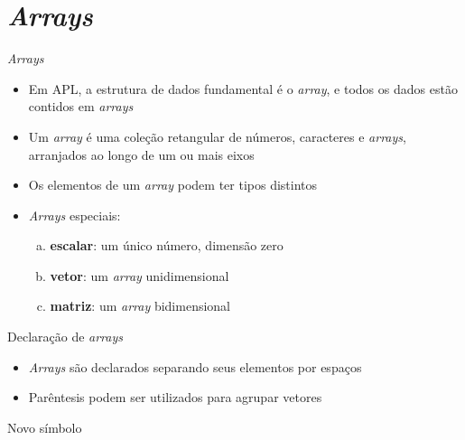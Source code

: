 \section{\it Arrays}

\begin{frame}[fragile]{\it Arrays}

    \begin{itemize}
        \item Em APL, a estrutura de dados fundamental é o \textit{array}, e todos os dados estão contidos em \textit{arrays}
        \pause

        \item Um \textit{array} é uma coleção retangular de números, caracteres e \textit{arrays}, arranjados ao longo de um ou mais eixos
        \pause

        \item Os elementos de um \textit{array} podem ter tipos distintos
        \pause

        \item \textit{Arrays} especiais:
            \begin{enumerate}[(a)]
                \item \textbf{escalar}: um único número, dimensão zero
                \item \textbf{vetor}: um \textit{array} unidimensional
                \item \textbf{matriz}: um \textit{array} bidimensional
            \end{enumerate}
    \end{itemize}

\end{frame}

\begin{frame}[fragile]{Declaração de {\it arrays}}

    \begin{itemize}
        \item \textit{Arrays} são declarados separando seus elementos por espaços
        \pause

        \item Parêntesis podem ser utilizados para agrupar vetores
    \end{itemize}

\end{frame}

\begin{frame}[fragile]{Novo símbolo}


\end{frame}

